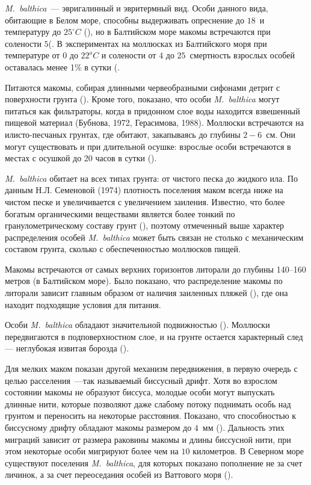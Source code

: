 \textit{M.~balthica}~--- эвригалинный и эвритермный вид. 
Особи данного вида, обитающие в Белом море, способны выдерживать опреснение до $18$\permil\ и температуру до $25^{\circ}C$ (\cite{Naumov_2006}), но в Балтийском море макомы встречаются при солености $5$\permil (\cite{Karpevich_Shurin_1970}.
В экспериментах на моллюсках из Балтийского моря при температуре от $0$ до $22^oC$ и солености от $4$ до $25$\permil\ смертность взрослых особей оставалась менее 1\% в сутки (\cite{Karpevich_1968}.

Питаются макомы, собирая длинными червеобразными сифонами детрит с поверхности грунта (\cite{Naumov_2006}). 
Кроме того, показано, что особи \textit{M.~balthica} могут питаться как фильтраторы, когда в придонном слое воды находится взвешенный пищевой материал (Бубнова, 1972, Герасимова, 1988). 
Моллюски встречаются на илисто-песчаных грунтах, где обитают, закапываясь до глубины $2-6$~см. 
Они могут существовать и при длительной осушке: взрослые особи встречаются в местах с осушкой до 20 часов в сутки (\cite{Sveshnikov_1963}). 

\textit{M.~balthica} обитает на всех типах грунта: от чистого песка до жидкого ила. 
По данным Н.Л. Семеновой (1974) плотность поселения маком всегда ниже на чистом песке и увеличивается с увеличением заиления. 
Известно, что более богатым органическими веществами является более тонкий по гранулометрическому составу грунт (\cite{Bubnova_1972}), поэтому отмеченный выше характер распределения особей \textit{M.~balthica} может быть связан не столько с механическим составом грунта, сколько с обеспеченностью моллюсков пищей.

Макомы встречаются от самых верхних горизонтов литорали до глубины 140–160 метров (в Балтийском море). 
Было показано, что распределение макомы по литорали зависит главным образом от наличия заиленных пляжей (\cite{Semenova_1974}), где она находит подходящие условия для питания. 
	
Особи \textit{M.~balthica} обладают значительной подвижностью (\cite{Sveshnikov_1963}). 
Моллюски передвигаются в подповерхностном слое, и на грунте остается характерный след --- неглубокая извитая борозда (\cite{Naumov_2006}). 

Для мелких маком показан другой механизм передвижения, в первую очередь с целью расселения~---так называемый биссусный дрифт. 
Хотя во взрослом состоянии макомы не образуют биссуса, молодые особи могут выпускать длинные нити, которые позволяют даже слабому потоку поднимать особь над грунтом и переносить на некоторые расстояния. 
Показано, что способностью к биссусному дрифту обладают макомы размером до $4$~мм (\cite{Armonies_Hellwig-Armonies_1992}). 
Дальность этих миграций зависит от размера раковины макомы и длины биссусной нити, при этом некоторые особи мигрируют более чем на $10$ километров. 
В Северном море существуют поселения \textit{M.~balthica}, для которых показано пополнение не за счет личинок, а за счет переоседания особей из Ваттового моря (\cite{Beukema_deVlas_1989}).



